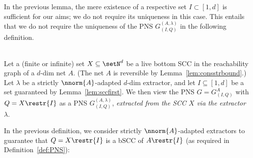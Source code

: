 \noindent
In the previous lemma, the mere existence of a respective set $I\subset[1,d]$
is sufficient for our aims; we do not require its uniqueness in
this case. This entails that we do not require the uniqueness of 
the PNS $G^{(A,\lambda)}_{(I,Q)}$ in the following definition.

\begin{defi}\label{def:extrPNS}
\hfill\\
Let a (finite or infinite) set $X\subseteq \setN^d$ be a live bottom SCC in the reachability graph of
	a $d$-dim net $A$. (The net $A$ is reversible by
	Lemma~\ref{lem:consstrbound}.)
	Let $\lambda$ be a strictly $\nnorm{A}$-adapted $d$-dim
extractor, and let $I\subseteq[1,d]$ be a set guaranteed by
Lemma~\ref{lem:sccfirst}. 
We then view the PNS $G=G^A_{(I,Q)}$ with  $Q=X\restr{I}$ as a PNS 
	$G^{(A,\lambda)}_{(I,Q)}$, \emph{extracted from the SCC $X$ via the extractor
	$\lambda$}.
\end{defi}


\noindent
In the previous definition, we consider strictly $\nnorm{A}$-adapted 
extractors to guarantee that $Q=X\restr{I}$ is a bSCC of $A\restr{I}$
(as required in Definition~\ref{def:PNS}):

